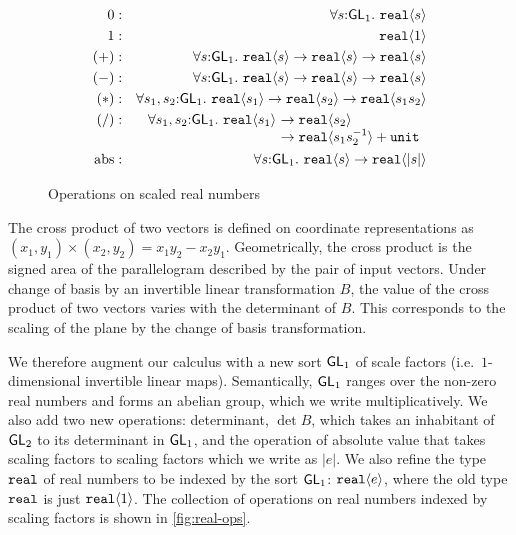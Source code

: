 \begin{figure}[t]
  \centering
  \begin{eqnarray*}
    0   &:& \forall s \mathord:\SynGL{1}.\ \tyPrim{real}{s} \\
    1   &:& \tyPrim{real}{1} \\
    (+) &:& \forall s \mathord:\SynGL{1}.\ \tyPrim{real}{s} \to \tyPrim{real}{s} \to \tyPrim{real}{s} \\
    (-) &:& \forall s \mathord:\SynGL{1}.\ \tyPrim{real}{s} \to \tyPrim{real}{s} \to \tyPrim{real}{s} \\
    (*) &:& \forall s_1,s_2 \mathord:\SynGL{1}.\ \tyPrim{real}{s_1} \to \tyPrim{real}{s_2} \to \tyPrim{real}{s_1s_2} \\
    (/) &:&
    \begin{array}[t]{@{}l@{}l}
      \forall s_1,s_2 \mathord:\SynGL{1}.\ \tyPrim{real}{s_1}\ & \to \tyPrim{real}{s_2} \\
      &\to \tyPrim{real}{s_1s_2^{-1}} + \tyPrimNm{unit} \\
    \end{array}\\
    \mathrm{abs} &:& \forall s \mathord:\SynGL{1}.\ \tyPrim{real}{s} \to \tyPrim{real}{|s|} %
  \end{eqnarray*}
  \caption{Operations on scaled real numbers}
  \label{fig:real-ops}
\end{figure}

The cross product of two vectors is defined on coordinate
representations as $(x_1,y_1) \times (x_2,y_2) = x_1y_2 - x_2y_1$.
Geometrically, the cross product is the signed area of the
parallelogram described by the pair of input vectors. Under change of
basis by an invertible linear transformation $B$, the value of the
cross product of two vectors varies with the determinant of $B$. This
corresponds to the scaling of the plane by the change of basis
transformation.

We therefore augment our calculus with a new sort $\mathsf{GL}_1$ of scale
factors (i.e.~$1$-dimensional invertible linear maps). Semantically,
$\mathsf{GL}_1$ ranges over the non-zero real numbers and forms an abelian
group, which we write multiplicatively. We also add two new
operations: determinant, $\det B$, which takes an inhabitant of
$\mathsf{GL}_2$ to its determinant in $\mathsf{GL}_1$, and the operation of
absolute value that takes scaling factors to scaling factors which we
write as $|e|$. We also refine the type $\texttt{real}$ of real
numbers to be indexed by the sort $\mathsf{GL}_1$: $\texttt{real}\langle e \rangle$,
where the old type $\texttt{real}$ is just $\texttt{real}\langle 1 \rangle$. The
collection of operations on real numbers indexed by scaling factors is
shown in \autoref{fig:real-ops}.

